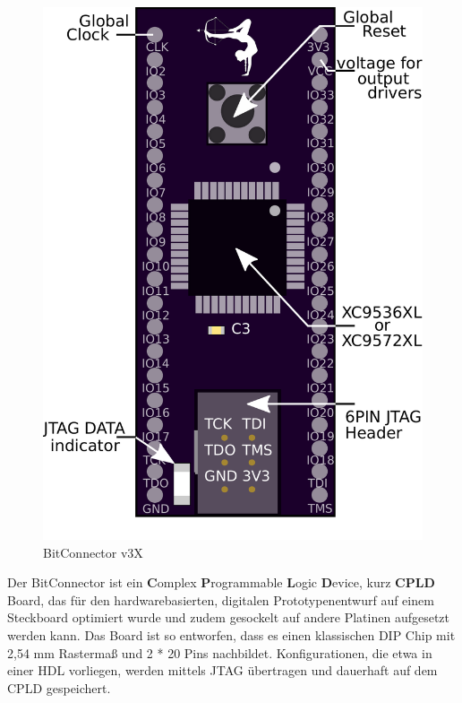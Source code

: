 \documentclass{article}
\begin{document}
\vspace{0.5cm}


\begin{figure}
		\vspace { -15pt }
	\includegraphics[scale=0.3]{BitConnector6P} 
	\caption{BitConnector v3X}
	\label{fig:}
\end{figure}

Der BitConnector ist ein \textbf{C}omplex \textbf{P}rogrammable \textbf{L}ogic \textbf{D}evice, kurz \textbf{CPLD} Board, das für den  hardwarebasierten, digitalen Prototypenentwurf auf einem Steckboard optimiert wurde und zudem gesockelt auf andere Platinen aufgesetzt werden kann. Das Board ist so entworfen, dass es einen klassischen DIP Chip mit 2,54 mm Rastermaß und 2 * 20 Pins nachbildet. Konfigurationen, die etwa in einer HDL vorliegen, werden mittels JTAG übertragen und dauerhaft auf dem CPLD gespeichert.
 
\end{document}
